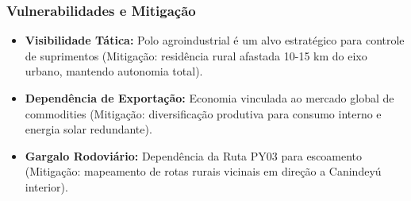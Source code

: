 \subsubsection{Vulnerabilidades e
Mitigação}

\begin{itemize}
\tightlist
\item
  \textbf{Visibilidade Tática:} Polo agroindustrial é um alvo
  estratégico para controle de suprimentos (Mitigação: residência rural
  afastada 10-15 km do eixo urbano, mantendo autonomia total).
\item
  \textbf{Dependência de Exportação:} Economia vinculada ao mercado
  global de commodities (Mitigação: diversificação produtiva para
  consumo interno e energia solar redundante).
\item
  \textbf{Gargalo Rodoviário:} Dependência da Ruta PY03 para escoamento
  (Mitigação: mapeamento de rotas rurais vicinais em direção a Canindeyú
  interior).
\end{itemize}

